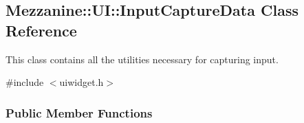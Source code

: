 \hypertarget{classMezzanine_1_1UI_1_1InputCaptureData}{
\subsection{Mezzanine::UI::InputCaptureData Class Reference}
\label{classMezzanine_1_1UI_1_1InputCaptureData}
}


This class contains all the utilities necessary for capturing input.  




{\ttfamily \#include $<$uiwidget.h$>$}

\subsubsection*{Public Member Functions}

